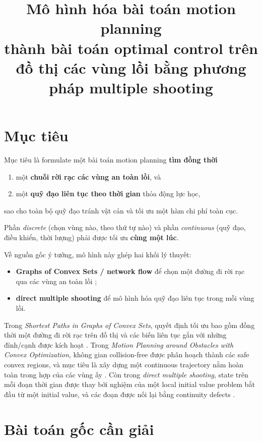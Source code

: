 \documentclass[12pt]{article}
\title{Mô hình hóa bài toán motion planning \\ thành bài toán optimal control trên đồ thị các vùng lồi bằng phương pháp multiple shooting}
\author{}
\date{}
\begin{document}
\maketitle
\tableofcontents
\newpage

\section{Mục tiêu}

Mục tiêu là formulate một bài toán motion planning \textbf{tìm đồng thời}
\begin{enumerate}[label=(\roman*)]
    \item một \textbf{chuỗi rời rạc các vùng an toàn lồi}, và
    \item một \textbf{quỹ đạo liên tục theo thời gian} thỏa động lực học,
\end{enumerate}
sao cho toàn bộ quỹ đạo tránh vật cản và tối ưu một hàm chi phí toàn cục.

Phần \emph{discrete} (chọn vùng nào, theo thứ tự nào) và phần \emph{continuous} (quỹ đạo, điều khiển, thời lượng) phải được tối ưu \textbf{cùng một lúc}.

Về nguồn gốc ý tưởng, mô hình này ghép hai khối lý thuyết:
\begin{itemize}
    \item \textbf{Graphs of Convex Sets / network flow} để chọn một đường đi rời rạc qua các vùng an toàn lồi \cite{marcucci2021,marcucci2022};
    \item \textbf{direct multiple shooting} để mô hình hóa quỹ đạo liên tục trong mỗi vùng lồi.
\end{itemize}

Trong \emph{Shortest Paths in Graphs of Convex Sets}, quyết định tối ưu bao gồm đồng thời một đường đi rời rạc trên đồ thị và các biến liên tục gắn với những đỉnh/cạnh được kích hoạt \cite{marcucci2021}. Trong \emph{Motion Planning around Obstacles with Convex Optimization}, không gian collision-free được phân hoạch thành các safe convex regions, và mục tiêu là xây dựng một continuous trajectory nằm hoàn toàn trong hợp của các vùng ấy \cite{marcucci2022}. Còn trong \emph{direct multiple shooting}, state trên mỗi đoạn thời gian được thay bởi nghiệm của một local initial value problem bắt đầu từ một initial value, và các đoạn được nối lại bằng continuity defects \cite{bockplitt,diehl2005}.

\section{Bài toán gốc cần giải}
\end{document}
